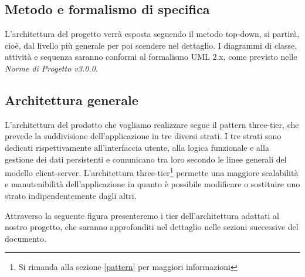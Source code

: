 \subsection{Metodo e formalismo di specifica}
L'architettura del progetto verrà esposta seguendo il metodo \gls{top-down}, si partirà, cioè, dal livello più generale per poi scendere nel dettaglio. I diagrammi di classe, attività e sequenza saranno conformi al formalismo \gls{UML} 2.x, come previsto nelle \textit{Norme di Progetto v3.0.0}.

\subsection{Architettura generale}
L'architettura del prodotto che vogliamo realizzare segue il pattern three-tier, che prevede la suddivisione dell'applicazione in tre diversi strati. I tre strati sono dedicati rispettivamente all'interfaccia utente, alla logica funzionale e alla gestione dei dati persistenti e comunicano tra loro secondo le linee generali del modello client-server. L'architettura three-tier\footnote{Si rimanda alla sezione \ref{pattern} per maggiori informazioni} permette una maggiore scalabilità e manutenibilità dell'applicazione in quanto è possibile modificare o sostituire uno strato indipendentemente dagli altri.

Attraverso la seguente figura presenteremo i tier dell'architettura adattati al nostro progetto, che saranno approfonditi nel dettaglio nelle sezioni successive del documento.

